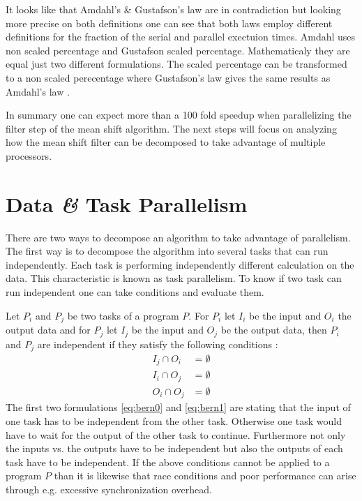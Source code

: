 It looks like that Amdahl's \& Gustafson's law are in contradiction but looking
more precise on both definitions one can see that both laws employ different
definitions for the fraction of the serial and parallel exectuion times. Amdahl
uses non scaled percentage and Gustafson scaled percentage. Mathematicaly they
are equal just two different formulations. The scaled percentage can be
transformed to a non scaled perecentage where Gustafson's law gives the same
results as Amdahl's law \citep{citeulike:3838998}.

In summary one can expect more than a 100 fold speedup when parallelizing the
filter step of the mean shift algorithm. The next steps will focus on analyzing
how the mean shift filter can be decomposed to take advantage of multiple
processors.

\section{Data {\itshape{\&}} Task Parallelism} %
\label{sec:data_and_task_parallelism}
There are two ways to decompose an algorithm to take advantage of parallelism.
The first way is to decompose the algorithm into several tasks that can run
independently. Each task is performing independently different calculation on
the data. This characteristic is known as task parallelism. To know if two task
can run independent one can take \citeauthor{citeulike:6113408} conditions and
evaluate them.

Let $P_i$ and $P_j$ be two tasks of a program $P$. For $P_i$ let $I_i$ be the
input and $O_i$ the output data and for $P_j$ let $I_j$ be the input and $O_j$
be the output data, then $P_i$ and $P_j$ are independent if they satisfy the
following conditions
\citep{citeulike:3838998}:
\begin{subequations}\label{eq:bern_cond}
  \begin{align}
    I_j \cap O_i & = \emptyset \label{eq:bern0}\\
    I_i \cap O_j & = \emptyset \label{eq:bern1}\\
    O_i \cap O_j & = \emptyset \label{eq:bern2}
  \end{align}
\end{subequations}
The first two formulations \autoref{eq:bern0} and \autoref{eq:bern1} are stating
that the input of one task has to be independent from the other task. Otherwise
one task would have to wait for the output of the other task to continue.
Furthermore not only the inputs vs. the outputs have to be independent but also
the outputs of each task have to be independent. If the above conditions cannot
be applied to a program $P$ than it is likewise that race conditions and poor
performance can arise through e.g. excessive synchronization overhead.


